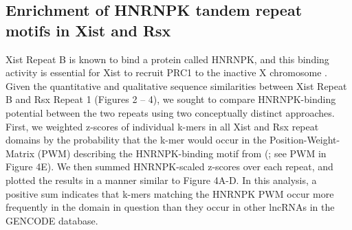 \subsection{Enrichment of HNRNPK tandem repeat motifs in Xist and Rsx}
Xist Repeat B is known to bind a protein called HNRNPK, and this binding activity is essential for Xist to recruit PRC1 to the inactive X chromosome \cite{Pintacuda2017HnRNPKSilencing}. Given the quantitative and qualitative sequence similarities between Xist Repeat B and Rsx Repeat 1 (Figures 2 – 4), we sought to compare HNRNPK-binding potential between the two repeats using two conceptually distinct approaches. First, we weighted z-scores of individual k-mers in all Xist and Rsx repeat domains by the probability that the k-mer would occur in the Position-Weight-Matrix (PWM) describing the HNRNPK-binding motif from (\cite{Ray2013ARegulation}; see PWM in Figure 4E). We then summed HNRNPK-scaled z-scores over each repeat, and plotted the results in a manner similar to Figure 4A-D. In this analysis, a positive sum indicates that k-mers matching the HNRNPK PWM occur more frequently in the domain in question than they occur in other lncRNAs in the GENCODE database.

